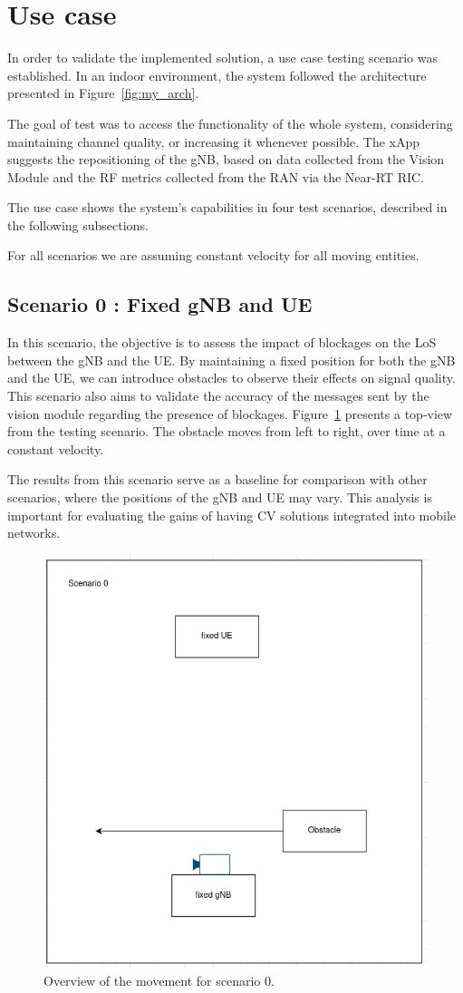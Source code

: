 \section{Use case}\label{sec:use_case}
In order to validate the implemented solution, a use case testing scenario was established.
In an indoor environment, the system followed the architecture presented in Figure~\ref{fig:my_arch}.

The goal of test was to access the functionality of the whole system, considering maintaining channel quality, or increasing it whenever possible.
The xApp suggests the repositioning of the gNB, based on data collected from the Vision Module and the RF metrics collected from the RAN via the Near-RT RIC\@.

The use case shows the system's capabilities in four test scenarios, described in the following subsections.

For all scenarios we are assuming constant velocity for all moving entities.

\subsection{Scenario 0 : Fixed gNB and UE}\label{subsec:scenario-0-:-fixed-gnb-and-ue}

In this scenario, the objective is to assess the impact of blockages on the LoS between the gNB and the UE\@.
By maintaining a fixed position for both the gNB and the UE, we can introduce obstacles to observe their effects on signal quality.
This scenario also aims to validate the accuracy of the messages sent by the vision module regarding the presence of blockages.
Figure~\ref{fig:test_fixed} presents a top-view from the testing scenario.
The obstacle moves from left to right, over time at a constant velocity.

The results from this scenario serve as a baseline for comparison with other scenarios, where the positions of the gNB and UE may vary.
This analysis is important for evaluating the gains of having CV solutions integrated into mobile networks.

\begin{figure}[H]
    \centering
    \includegraphics[width=0.5\linewidth]{figures/scenario0}
    \caption{Overview of the movement for scenario 0.}
    \label{fig:test_fixed}
\end{figure}

